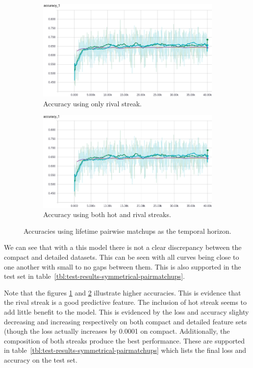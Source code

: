 \documentclass{article} %
\begin{document}
\begin{figure}[!htb]
  \begin{subfigure}{0.5\textwidth}
    \includegraphics[width=\linewidth]{plots/model1/pairwise-matchups/streak-r/accuracy.png}
    \caption{Accuracy using only rival streak.}\label{fig:pairwise-matchups-r-accuracy}
  \end{subfigure}
  \begin{subfigure}{0.5\textwidth}
    \includegraphics[width=\linewidth]{plots/model1/pairwise-matchups/streak-hr/accuracy.png}
    \caption{Accuracy using both hot and rival streaks.}\label{fig:pairwise-matchups-hr-accuracy}
  \end{subfigure}
  \caption{Accuracies using lifetime pairwise matchups as the temporal horizon.}
  \label{fig:pairwise-accuracies}
\end{figure}

We can see that with a this model there is not a clear discrepancy between the compact and detailed datasets.
This can be seen with all curves being close to one another with small to no gaps between them.
This is also supported in the test set in table~\ref{tbl:test-results-symmetrical-pairmatchups}.

Note that the figures \ref{fig:pairwise-matchups-r-accuracy} and \ref{fig:pairwise-matchups-hr-accuracy} illustrate higher accuracies.
This is evidence that the rival streak is a good predictive feature.
The inclusion of hot streak seems to add little benefit to the model.
This is evidenced by the loss and accuracy slighty decreasing and increasing respectively on both compact and detailed feature sets (though the loss actually increases by 0.0001 on compact.
Additionally, the composition of both streaks produce the best performance.
These are supported in table~\ref{tbl:test-results-symmetrical-pairmatchups} which lists the final loss and accuracy on the test set.
\end{document}
